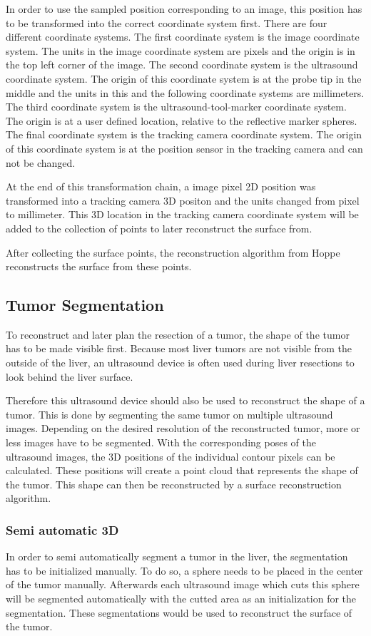 In order to use the sampled position corresponding to an image, this
position has to be transformed into the correct coordinate system first. There
are four different coordinate systems. The first coordinate system is the image
coordinate system. The units in the image coordinate system are pixels and the
origin is in the top left corner of the image. The
second coordinate system is the ultrasound coordinate system. The origin of this
coordinate system is at the probe tip in the middle and the units in this and
the following coordinate systems are millimeters. The third coordinate system is the
ultrasound-tool-marker coordinate system. The origin is at a user defined
location, relative to the reflective marker spheres. The final
coordinate system is the tracking camera coordinate system. The origin of this
coordinate system is at the position sensor in the tracking camera and can not
be changed.

At the end of this transformation chain, a image pixel 2D position was
transformed into a tracking camera 3D positon and the units changed
from pixel to millimeter. This 3D location in the tracking camera coordinate system
will be added to the collection of points to later reconstruct the surface from.

After collecting the surface points, the reconstruction algorithm from Hoppe
\cite{hoppe1992surface} reconstructs the surface from these points.
\subsection{Tumor Segmentation}
To reconstruct and later plan the resection of a tumor, the shape
of the tumor has to be made visible first. Because most liver tumors are not visible from the outside of the liver, an
ultrasound device is often used during liver resections to look behind the
liver surface.

Therefore this ultrasound device should also be used to
reconstruct the shape of a tumor. This is done by segmenting the same tumor on
multiple ultrasound images. Depending on the desired resolution of the
reconstructed tumor, more or less images have to be segmented. With the corresponding
poses of the ultrasound images, the 3D positions of the individual contour
pixels can be calculated. These positions will create a point cloud that
represents the shape of the tumor. This shape can then be reconstructed by a
surface reconstruction algorithm.
\subsubsection{Semi automatic 3D}
In order to semi automatically segment a tumor in the liver, the segmentation
has to be initialized manually. To do so, a sphere needs to be
placed in the center of the tumor manually. Afterwards each ultrasound image
which cuts this sphere will be segmented automatically with the cutted area as
an initialization for the segmentation. These segmentations would be used to
reconstruct the surface of the tumor.
